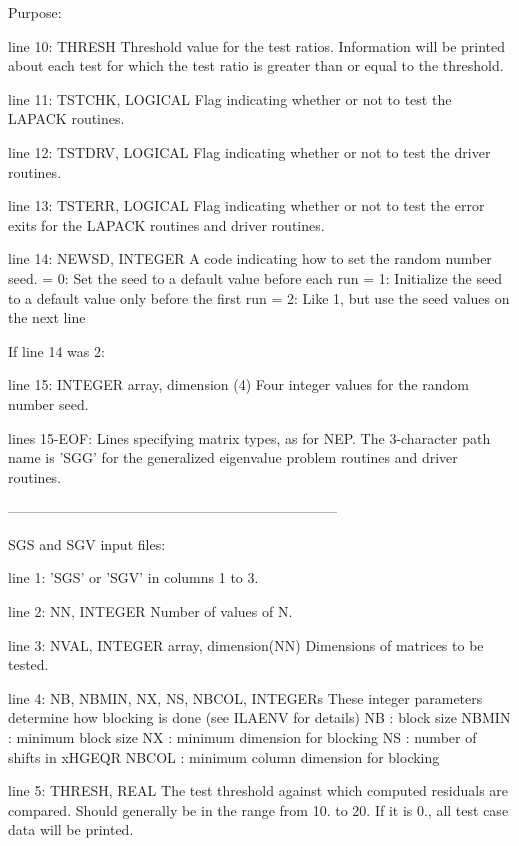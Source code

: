 \begin{DoxyParagraph}{Purpose\+: }
\begin{DoxyVerb}
 line 10: THRESH
          Threshold value for the test ratios.  Information will be
          printed about each test for which the test ratio is greater
          than or equal to the threshold.

 line 11: TSTCHK, LOGICAL
          Flag indicating whether or not to test the LAPACK routines.

 line 12: TSTDRV, LOGICAL
          Flag indicating whether or not to test the driver routines.

 line 13: TSTERR, LOGICAL
          Flag indicating whether or not to test the error exits for
          the LAPACK routines and driver routines.

 line 14: NEWSD, INTEGER
          A code indicating how to set the random number seed.
          = 0:  Set the seed to a default value before each run
          = 1:  Initialize the seed to a default value only before the
                first run
          = 2:  Like 1, but use the seed values on the next line

 If line 14 was 2:

 line 15: INTEGER array, dimension (4)
          Four integer values for the random number seed.

 lines 15-EOF:  Lines specifying matrix types, as for NEP.
          The 3-character path name is 'SGG' for the generalized
          eigenvalue problem routines and driver routines.

-----------------------------------------------------------------------

 SGS and SGV input files:

 line 1:  'SGS' or 'SGV' in columns 1 to 3.

 line 2:  NN, INTEGER
          Number of values of N.

 line 3:  NVAL, INTEGER array, dimension(NN)
          Dimensions of matrices to be tested.

 line 4:  NB, NBMIN, NX, NS, NBCOL, INTEGERs
          These integer parameters determine how blocking is done
          (see ILAENV for details)
          NB     : block size
          NBMIN  : minimum block size
          NX     : minimum dimension for blocking
          NS     : number of shifts in xHGEQR
          NBCOL  : minimum column dimension for blocking

 line 5:  THRESH, REAL
          The test threshold against which computed residuals are
          compared. Should generally be in the range from 10. to 20.
          If it is 0., all test case data will be printed.


\end{DoxyVerb}
\end{DoxyParagraph}
